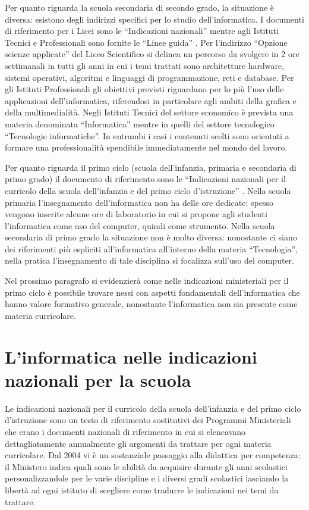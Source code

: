 \documentclass[12pt]{report}
\begin{document}
Per quanto riguarda la scuola secondaria di secondo grado, la situazione è diversa: esistono degli indirizzi specifici per lo studio dell'informatica. I documenti di riferimento per i Licei sono le ``Indicazioni nazionali'' \cite{IndicazioniLicei} mentre agli Istituti Tecnici e Professionali sono fornite le ``Linee guida'' \cite{IndicazioniIstituti}.
Per l'indirizzo “Opzione scienze applicate” del Liceo Scientifico si delinea un percorso da svolgere in 2 ore settimanali in tutti gli anni in cui i temi trattati sono architetture hardware, sistemi operativi, algoritmi e linguaggi di programmazione, reti e database.
Per gli Istituti Professionali gli obiettivi previsti riguardano per lo più l'uso delle applicazioni dell'informatica, riferendosi in particolare agli ambiti della grafica e della multimedialità.
Negli Istituti Tecnici del settore economico è prevista una materia denominata ``Informatica'' mentre in quelli del settore tecnologico ``Tecnologie informatiche''. In entrambi i casi i contenuti scelti sono orientati a formare una professionalità spendibile immediatamente nel mondo del lavoro.

Per quanto riguarda il primo ciclo (scuola dell'infanzia, primaria e secondaria di primo grado) il documento di riferimento sono le ``Indicazioni nazionali per il curricolo della scuola dell'infanzia e del primo ciclo d'istruzione'' \cite{indicazioniNazionali}.
Nella scuola primaria l'insegnamento dell'informatica non ha delle ore dedicate: spesso vengono inserite alcune ore di laboratorio in cui si propone agli studenti l'informatica come uso del computer, quindi come strumento.
Nella scuola secondaria di primo grado la situazione non è molto diversa: nonostante ci siano dei riferimenti più espliciti all'informatica all'interno della materia ``Tecnologia'', nella pratica l'insegnamento di tale disciplina si focalizza sull'uso del computer.


Nel prossimo paragrafo si evidenzierà come nelle indicazioni ministeriali per il primo ciclo è possibile trovare nessi con aspetti fondamentali dell'informatica che hanno valore formativo generale, nonostante l'informatica non sia presente come materia curricolare.
\section{L'informatica nelle indicazioni nazionali per la scuola}
\label{indicazioni}
Le indicazioni nazionali per il curricolo della scuola dell'infanzia e del primo ciclo d’istruzione \cite{indicazioniNazionali} sono un testo di riferimento sostitutivi dei Programmi Ministeriali che erano i documenti nazionali di riferimento in cui si elencavano dettagliatamente annualmente gli argomenti da trattare per ogni materia curricolare. Dal 2004 vi è un sostanziale passaggio alla didattica per competenza: il Ministero indica quali sono le abilità da acquisire durante gli anni scolastici personalizzandole per le varie discipline e i diversi gradi scolastici lasciando la libertà ad ogni istituto di scegliere come tradurre le indicazioni nei temi da trattare.
\end{document}
